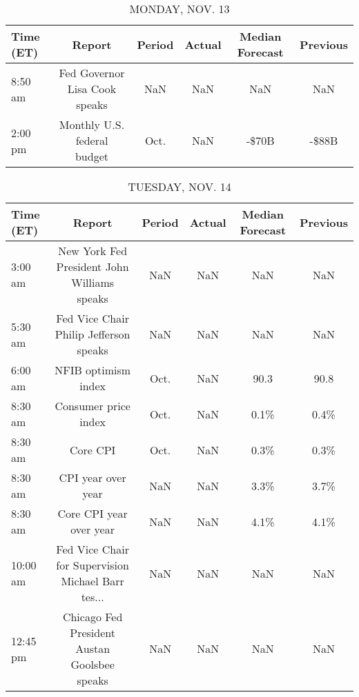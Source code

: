 \documentclass{article}%
\begin{document}
%
\normalsize%


\begin{table}[htbp]%
\caption{MONDAY, NOV. 13}%
\centering%
\begin{adjustbox}{width=1\textwidth}%
\begin{tabular}{lccccc}
\toprule
Time (ET) &                        Report & Period & Actual & Median Forecast & Previous \\
\midrule
  8:50 am & Fed Governor Lisa Cook speaks &    NaN &    NaN &             NaN &      NaN \\
  2:00 pm &   Monthly U.S. federal budget &   Oct. &    NaN &           -\$70B &    -\$88B \\
\bottomrule
\end{tabular}
%
\end{adjustbox}%
\end{table}

%


\begin{table}[htbp]%
\caption{TUESDAY, NOV. 14}%
\centering%
\begin{adjustbox}{width=1\textwidth}%
\begin{tabular}{lccccc}
\toprule
Time (ET) &                                             Report & Period & Actual & Median Forecast & Previous \\
\midrule
  3:00 am &        New York Fed President John Williams speaks &    NaN &    NaN &             NaN &      NaN \\
  5:30 am &             Fed Vice Chair Philip Jefferson speaks &    NaN &    NaN &             NaN &      NaN \\
  6:00 am &                                NFIB optimism index &   Oct. &    NaN &            90.3 &     90.8 \\
  8:30 am &                               Consumer price index &   Oct. &    NaN &            0.1\% &     0.4\% \\
  8:30 am &                                           Core CPI &   Oct. &    NaN &            0.3\% &     0.3\% \\
  8:30 am &                                 CPI year over year &    NaN &    NaN &            3.3\% &     3.7\% \\
  8:30 am &                            Core CPI year over year &    NaN &    NaN &            4.1\% &     4.1\% \\
 10:00 am & Fed Vice Chair for Supervision Michael Barr tes... &    NaN &    NaN &             NaN &      NaN \\
 12:45 pm &       Chicago Fed President Austan Goolsbee speaks &    NaN &    NaN &             NaN &      NaN \\
\bottomrule
\end{tabular}
%
\end{adjustbox}%
\end{table}
\end{document}

